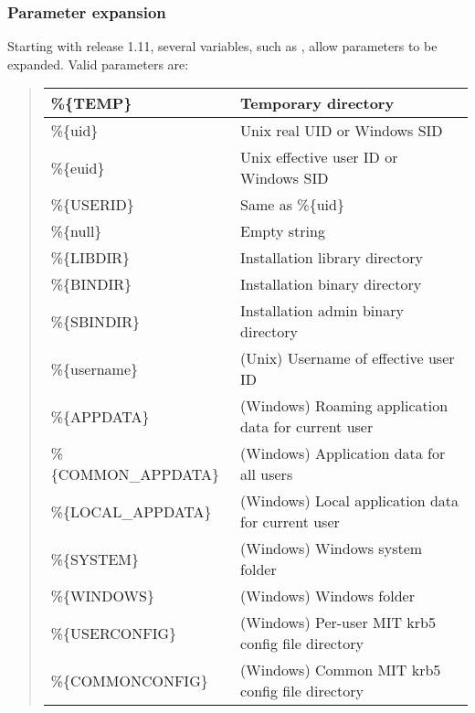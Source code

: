 \documentclass[letterpaper,10pt,english]{sphinxmanual}
\begin{document}
\subsubsection{Parameter expansion}
\label{\detokenize{admin/conf_files/krb5_conf:id7}}\label{\detokenize{admin/conf_files/krb5_conf:parameter-expansion}}
Starting with release 1.11, several variables, such as
, allow parameters to be expanded.
Valid parameters are:
\begin{quote}


\begin{savenotes}\sphinxattablestart
\centering
\begin{tabulary}{\linewidth}[t]{|T|T|}
\hline

\%\{TEMP\}
&
Temporary directory
\\
\hline
\%\{uid\}
&
Unix real UID or Windows SID
\\
\hline
\%\{euid\}
&
Unix effective user ID or Windows SID
\\
\hline
\%\{USERID\}
&
Same as \%\{uid\}
\\
\hline
\%\{null\}
&
Empty string
\\
\hline
\%\{LIBDIR\}
&
Installation library directory
\\
\hline
\%\{BINDIR\}
&
Installation binary directory
\\
\hline
\%\{SBINDIR\}
&
Installation admin binary directory
\\
\hline
\%\{username\}
&
(Unix) Username of effective user ID
\\
\hline
\%\{APPDATA\}
&
(Windows) Roaming application data for current user
\\
\hline
\%\{COMMON\_APPDATA\}
&
(Windows) Application data for all users
\\
\hline
\%\{LOCAL\_APPDATA\}
&
(Windows) Local application data for current user
\\
\hline
\%\{SYSTEM\}
&
(Windows) Windows system folder
\\
\hline
\%\{WINDOWS\}
&
(Windows) Windows folder
\\
\hline
\%\{USERCONFIG\}
&
(Windows) Per-user MIT krb5 config file directory
\\
\hline
\%\{COMMONCONFIG\}
&
(Windows) Common MIT krb5 config file directory
\\
\hline
\end{tabulary}
\par
\sphinxattableend\end{savenotes}
\end{quote}
\end{document}
